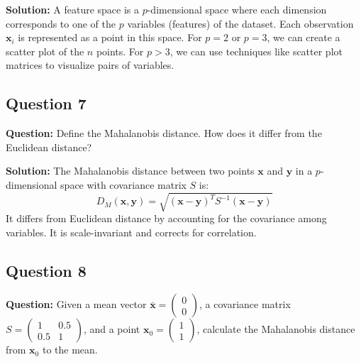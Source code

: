 \textbf{Solution:}
A feature space is a $p$-dimensional space where each dimension corresponds to one of the $p$ variables (features) of the dataset. Each observation $\mathbf{x}_i$ is represented as a point in this space. For $p=2$ or $p=3$, we can create a scatter plot of the $n$ points. For $p>3$, we can use techniques like scatter plot matrices to visualize pairs of variables.

\subsection*{Question 7}
\textbf{Question:} Define the Mahalanobis distance. How does it differ from the Euclidean distance?

\textbf{Solution:}
The Mahalanobis distance between two points $\mathbf{x}$ and $\mathbf{y}$ in a $p$-dimensional space with covariance matrix $S$ is:
$$ D_M(\mathbf{x}, \mathbf{y}) = \sqrt{(\mathbf{x}-\mathbf{y})^T S^{-1} (\mathbf{x}-\mathbf{y})} $$
It differs from Euclidean distance by accounting for the covariance among variables. It is scale-invariant and corrects for correlation.

\subsection*{Question 8}
\textbf{Question:} Given a mean vector $\bar{\mathbf{x}} = \begin{pmatrix} 0 \\ 0 \end{pmatrix}$, a covariance matrix $S = \begin{pmatrix} 1 & 0.5 \\ 0.5 & 1 \end{pmatrix}$, and a point $\mathbf{x}_0 = \begin{pmatrix} 1 \\ 1 \end{pmatrix}$, calculate the Mahalanobis distance from $\mathbf{x}_0$ to the mean.

